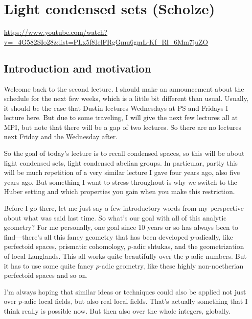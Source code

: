
\section{\ufs Light condensed sets (Scholze)}

\url{https://www.youtube.com/watch?v=_4G582SIo28&list=PLx5f8IelFRgGmu6gmL-Kf_Rl_6Mm7juZO}
\renewcommand{\yt}[2]{\href{https://www.youtube.com/watch?v=_4G582SIo28&list=PLx5f8IelFRgGmu6gmL-Kf_Rl_6Mm7juZO&t=#1}{#2}}
\vspace{1em}

\subsection{Introduction and motivation}

Welcome back to the second lecture. I should make an announcement about the schedule for the next few weeks, which is a little bit different than usual. Usually, it should be the case that Dustin lectures Wednesdays at PS and Fridays I lecture here. But due to some traveling, I will give the next few lectures all at MPI, but note that there will be a gap of two lectures. So there are no lectures next Friday and the Wednesday after.

So the goal of today's lecture is to recall condensed spaces, so this will be about light condensed sets, light condensed abelian groups. In particular, partly this will be much repetition of a very similar lecture I gave four years ago, also five years ago. But something I want to stress throughout is why we switch to the Huber setting and which properties you gain when you make this restriction.

Before I go there, let me just say a few introductory words from my perspective about what was said last time. So what's our goal with all of this analytic geometry? For me personally, one goal since 10 years or so has always been to find---there's all this fancy geometry that has been developed $p$-adically, like perfectoid spaces, prismatic cohomology, $p$-adic shtukas, and the geometrization of local Langlands. This all works quite beautifully over the $p$-adic numbers. But it has to use some quite fancy $p$-adic geometry, like these highly non-noetherian perfectoid spaces and so on.

I'm always hoping that similar ideas or techniques could also be applied not just over $p$-adic local fields, but also real local fields. That's actually something that I think really is possible now. But then also over the whole integers, globally.

